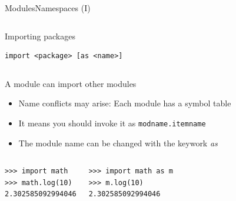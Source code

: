 \documentclass[10pt,compress]{beamer} %
\begin{document}
\begin{frame}[fragile]{Modules}{Namespaces (I)}
    \vspace{-0.5cm}
	\begin{columns}
	\begin{block}{Importing packages}
	\begin{verbatim}
import <package> [as <name>]
\end{verbatim}
	\end{block}
    \end{columns}

    \smallskip

	A module can import other modules
		\begin{itemize}
		\item Name conflicts may arise: Each module has a symbol table
		\item It means you should invoke it as \texttt{modname.itemname}
        \item The module name can be changed with the keywork \textit{as}
		\end{itemize}

	\begin{columns}
	\begin{exampleblock}{}
	\begin{verbatim}
>>> import math
>>> math.log(10)
2.302585092994046
\end{verbatim}
	\end{exampleblock}

	\begin{exampleblock}{}
	\begin{verbatim}
>>> import math as m
>>> m.log(10)
2.302585092994046
\end{verbatim}
	\end{exampleblock}
    \end{columns}

\end{frame}
\end{document}
